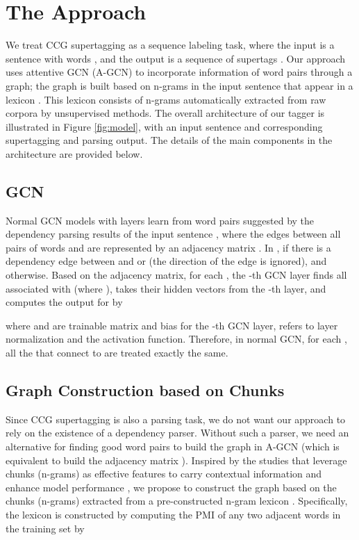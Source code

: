 \documentclass[11pt,a4paper]{article}
\begin{document}
\section{The Approach}


We treat CCG supertagging as a sequence labeling task,
where the input is a sentence with  words , 
and the output is 
a sequence of supertags .
Our approach uses attentive GCN (A-GCN) to incorporate information of word pairs through a graph;
the graph is built based on n-grams in the input sentence that appear in a lexicon .
This lexicon consists of 
n-grams automatically extracted from raw corpora by unsupervised methods.
The overall architecture of our tagger is illustrated in Figure \ref{fig:model}, with an input sentence and corresponding supertagging and parsing output.
The details of the main components in the architecture are provided below.



\subsection{GCN}


Normal GCN models with  layers learn from word pairs suggested by the dependency parsing results of the input sentence , where the edges between all pairs of words  and  are represented by an adjacency matrix .
In ,  if there is a dependency edge between  and  or 
(the direction of the edge is ignored), and  otherwise.
Based on the adjacency matrix, for each , the -th GCN layer finds all  associated with  (where ), takes their hidden vectors  from the -th layer, and computes the output for  by 

where  and  are trainable matrix and bias for the -th GCN layer,  refers to layer normalization and  the  activation function.
Therefore, in normal GCN, for each , all the  that connect to  are treated 
exactly the same.



\subsection{Graph Construction based on Chunks}


Since CCG supertagging is also a parsing task, we do not want our approach to rely on the
existence of a dependency parser.
Without such a parser, we need an alternative for finding good word pairs to build the graph in A-GCN (which is equivalent to build the adjacency matrix ).
Inspired by the studies that leverage chunks (n-grams) as effective features to carry contextual information and enhance model performance \cite{song-etal-2009-transliteration,song2012using,ishiwatari-etal-2017-chunk,yoon-etal-2018-learning,zhang-etal-2019-incorporating,tian-etal-2020-joint,tian2020improving,tian-etal-2020-constituency}, we propose to construct the graph based on the chunks (n-grams) extracted from a pre-constructed n-gram lexicon .
Specifically, the lexicon is constructed by computing the PMI of any two adjacent words  in the training set by
\end{document}

